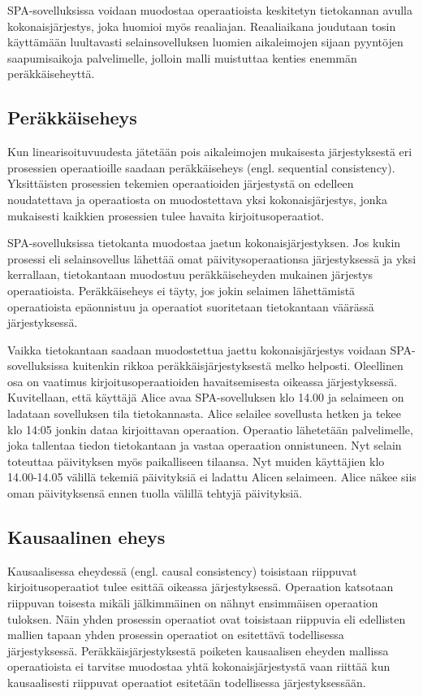 \documentclass[finnish,twoside,censored,csm,sw-track-2018]{HYthesisML}
\begin{document}
SPA-sovelluksissa voidaan muodostaa operaatioista keskitetyn tietokannan avulla kokonaisjärjestys, joka huomioi myös reaaliajan. Reaaliaikana joudutaan tosin käyttämään luultavasti selainsovelluksen luomien aikaleimojen sijaan pyyntöjen saapumisaikoja palvelimelle, jolloin malli muistuttaa kenties enemmän peräkkäiseheyttä.

\subsection{Peräkkäiseheys}

Kun linearisoituvuudesta jätetään pois aikaleimojen mukaisesta järjestyksestä eri prosessien operaatioille saadaan peräkkäiseheys \citep{linearizability} (engl. sequential consistency). Yksittäisten prosessien tekemien operaatioiden järjestystä on edelleen noudatettava ja operaatiosta on muodostettava yksi kokonaisjärjestys, jonka mukaisesti kaikkien prosessien tulee havaita kirjoitusoperaatiot.

SPA-sovelluksissa tietokanta muodostaa jaetun kokonaisjärjestyksen. Jos kukin prosessi eli selainsovellus lähettää omat päivitysoperaationsa järjestyksessä ja yksi kerrallaan, tietokantaan muodostuu peräkkäiseheyden mukainen järjestys operaatioista. Peräkkäiseheys ei täyty, jos jokin selaimen lähettämistä operaatioista epäonnistuu ja operaatiot suoritetaan tietokantaan väärässä järjestyksessä.

Vaikka tietokantaan saadaan muodostettua jaettu kokonaisjärjestys voidaan SPA-sovelluksissa kuitenkin rikkoa peräkkäisjärjestyksestä melko helposti. Oleellinen osa on vaatimus kirjoitusoperaatioiden havaitsemisesta oikeassa järjestyksessä. Kuvitellaan, että käyttäjä Alice avaa SPA-sovelluksen klo 14.00 ja selaimeen on ladataan sovelluksen tila tietokannasta. Alice selailee sovellusta hetken ja tekee klo 14:05 jonkin dataa kirjoittavan operaation. Operaatio lähetetään palvelimelle, joka tallentaa tiedon tietokantaan ja vastaa operaation onnistuneen. Nyt selain toteuttaa päivityksen myös paikalliseen tilaansa. Nyt muiden käyttäjien klo 14.00-14.05 välillä tekemiä päivityksiä ei ladattu Alicen selaimeen. Alice näkee siis oman päivityksensä ennen tuolla välillä tehtyjä päivityksiä.

\subsection{Kausaalinen eheys}

Kausaalisessa eheydessä \citep{causal} (engl. causal consistency) toisistaan riippuvat kirjoitusoperaatiot tulee esittää oikeassa järjestyksessä. Operaation katsotaan riippuvan toisesta mikäli jälkimmäinen on nähnyt ensimmäisen operaation tuloksen. Näin yhden prosessin operaatiot ovat toisistaan riippuvia eli edellisten mallien tapaan yhden prosessin operaatiot on esitettävä todellisessa järjestyksessä. Peräkkäisjärjestyksestä poiketen kausaalisen eheyden mallissa operaatioista ei tarvitse muodostaa yhtä kokonaisjärjestystä vaan riittää kun kausaalisesti riippuvat operaatiot esitetään todellisessa järjestyksessään.
\end{document}
